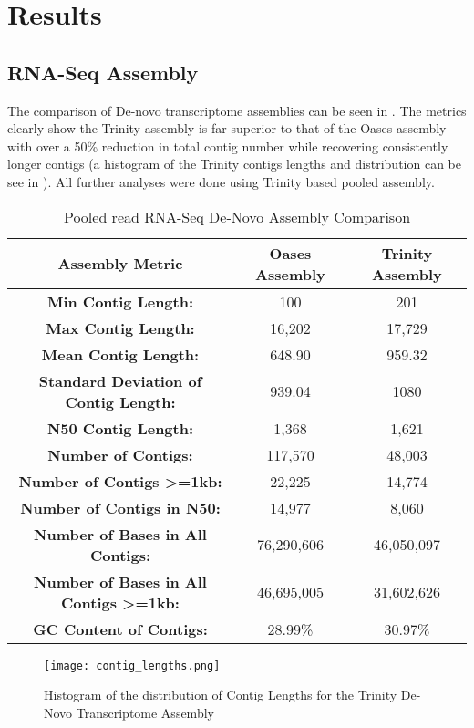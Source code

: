 \documentclass[a4paper,11pt]{article}
\begin{document}
\section{Results}
\subsection{RNA-Seq Assembly}
The comparison of De-novo transcriptome assemblies can be seen in .  
The metrics clearly show the Trinity assembly is far superior to that of the Oases assembly with over a 50\% reduction in total contig number while recovering consistently longer contigs (a histogram of the Trinity contigs lengths and distribution can be see in ). 
All further analyses were done using Trinity based pooled assembly.

\begin{table}
\centering
\begin{tabular}{| c || c | c |}
\hline
\textbf{Assembly Metric} & \textbf{Oases Assembly} & \textbf{Trinity Assembly} \\
\hline
\textbf{Min Contig Length:} & 100 & 201\\
\textbf{Max Contig Length:} & 16,202 & 17,729\\
\textbf{Mean Contig Length:} & 648.90 & 959.32\\
\textbf{Standard Deviation of Contig Length:} & 939.04 & 1080\\
\textbf{N50 Contig Length:} & 1,368 & 1,621 \\
\textbf{Number of Contigs:} & 117,570 & 48,003\\
\textbf{Number of Contigs >=1kb:} & 22,225 & 14,774\\
\textbf{Number of Contigs in N50:} & 14,977 & 8,060\\
\textbf{Number of Bases in All Contigs:} & 76,290,606 & 46,050,097\\
\textbf{Number of Bases in All Contigs >=1kb:} & 46,695,005 & 31,602,626\\
\textbf{GC Content of Contigs:} & 28.99\% & 30.97\% \\
\hline
\end{tabular}

\caption{Pooled read RNA-Seq De-Novo Assembly Comparison}
\label{tab:assembly_summary}
\end{table}


\begin{figure}
  \begin{center}
    \texttt{[image: contig\_lengths.png]}
    \caption{Histogram of the distribution of Contig Lengths for the Trinity De-Novo Transcriptome Assembly}
        \label{fig:contig_lengths}
  \end{center}
\end{figure}
\end{document}
